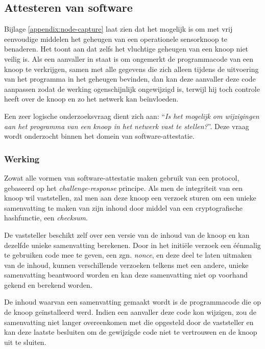 
\subsection{Attesteren van software}
\label{subsection:attestation}

Bijlage \ref{appendix:node-capture} laat zien dat het mogelijk is om met vrij
eenvoudige middelen het geheugen van een operationele sensorknoop te benaderen.
Het toont aan dat zelfs het vluchtige geheugen van een knoop niet veilig is.
Als een aanvaller in staat is om ongemerkt de programmacode van een knoop te
verkrijgen, samen met alle gegevens die zich alleen tijdens de uitvoering van
het programma in het geheugen bevinden, dan kan deze aanvaller deze code
aanpassen zodat de werking ogenschijnlijk ongewijzigd is, terwijl hij toch
controle heeft over de knoop en zo het netwerk kan be\"invloeden.

Een zeer logische onderzoeksvraag dient zich aan: ``\emph{Is het mogelijk om
wijzigingen aan het programma van een knoop in het netwerk vast te stellen?}''.
Deze vraag wordt onderzocht binnen het domein van software-attestatie.

\subsubsection*{Werking}

Zowat alle vormen van software-attestatie maken gebruik van een protocol,
gebaseerd op het \emph{challenge-response} principe. Als men de integriteit van
een knoop wil vaststellen, zal men aan deze knoop een verzoek sturen om een
unieke samenvatting te maken van zijn inhoud door middel van een
cryptografische hashfunctie, een \emph{checksum}.

De vaststeller beschikt zelf over een versie van de inhoud van de knoop en kan
dezelfde unieke samenvatting berekenen. Door in het initi\"ele verzoek een
\'e\'enmalig te gebruiken code mee te geven, een zgn. \emph{nonce}, en deze
deel te laten uitmaken van de inhoud, kunnen verschillende verzoeken telkens
met een andere, unieke samenvatting beantwoord worden en kan deze samenvatting
niet op voorhand gekend en berekend worden.

De inhoud waarvan een samenvatting gemaakt wordt is de programmacode die op de
knoop ge\"installeerd werd. Indien een aanvaller deze code kon wijzigen, zou de
samenvatting niet langer overeenkomen met die opgesteld door de vaststeller en
kan deze laatste besluiten om de gewijzigde code niet te vertrouwen en de knoop
uit te sluiten.


